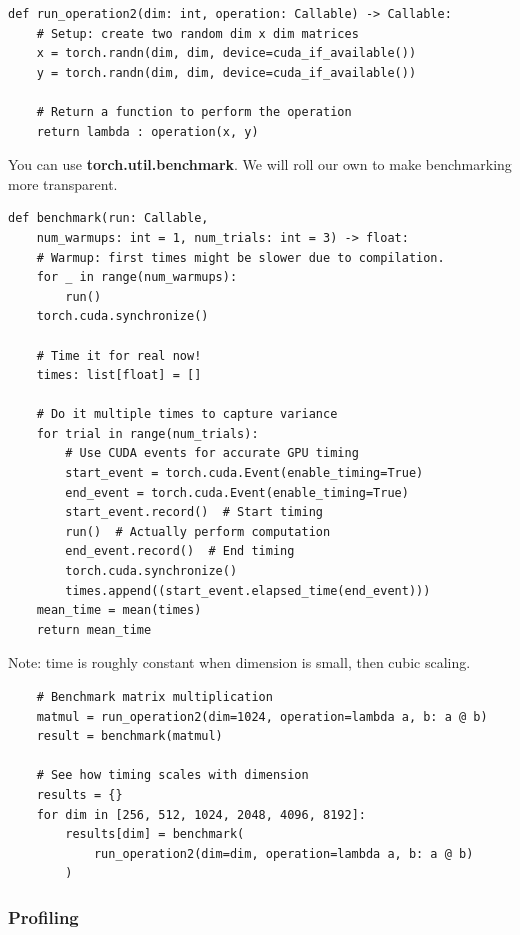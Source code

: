 \documentclass[12pt,twoside]{article}
\begin{document}
\begin{verbatim}
def run_operation2(dim: int, operation: Callable) -> Callable:
    # Setup: create two random dim x dim matrices
    x = torch.randn(dim, dim, device=cuda_if_available())
    y = torch.randn(dim, dim, device=cuda_if_available())
    
    # Return a function to perform the operation
    return lambda : operation(x, y)
\end{verbatim}

You can use \textbf{torch.util.benchmark}. We will roll our own to make benchmarking more transparent.

\begin{verbatim}
def benchmark(run: Callable, 
    num_warmups: int = 1, num_trials: int = 3) -> float:
    # Warmup: first times might be slower due to compilation.
    for _ in range(num_warmups):
        run()
    torch.cuda.synchronize()
    
    # Time it for real now!
    times: list[float] = [] 
    
    # Do it multiple times to capture variance
    for trial in range(num_trials): 
        # Use CUDA events for accurate GPU timing
        start_event = torch.cuda.Event(enable_timing=True)
        end_event = torch.cuda.Event(enable_timing=True)
        start_event.record()  # Start timing
        run()  # Actually perform computation
        end_event.record()  # End timing
        torch.cuda.synchronize()
        times.append((start_event.elapsed_time(end_event))) 
    mean_time = mean(times)  
    return mean_time
\end{verbatim}

Note: time is roughly constant when dimension is small, then cubic scaling.

\begin{verbatim}
    # Benchmark matrix multiplication
    matmul = run_operation2(dim=1024, operation=lambda a, b: a @ b)
    result = benchmark(matmul)  
    
    # See how timing scales with dimension
    results = {}
    for dim in [256, 512, 1024, 2048, 4096, 8192]:
        results[dim] = benchmark(
            run_operation2(dim=dim, operation=lambda a, b: a @ b)
        )
\end{verbatim}

\subsubsection*{Profiling}
\end{document}
